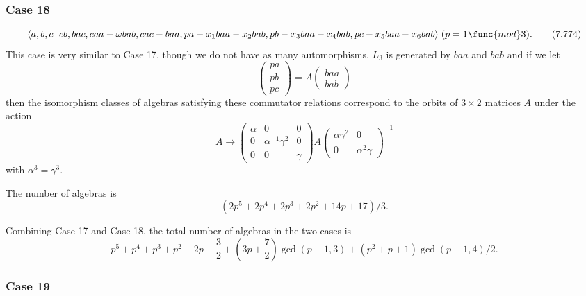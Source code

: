 \documentclass[10pt]{article}
\begin{document}
\subsubsection{Case 18}

\begin{equation}
\langle a,b,c\,|\,cb,bac,caa-\omega
bab,cac-baa,pa-x_{1}baa-x_{2}bab,pb-x_{3}baa-x_{4}bab,pc-x_{5}baa-x_{6}bab%
\rangle \;(p=1\func{mod}3).  \tag{7.774}
\end{equation}%
This case is very similar to Case 17, though we do not have as many
automorphisms. $L_{3}$ is generated by $baa$ and $bab$ and if we let 
\[
\left( 
\begin{array}{l}
pa \\ 
pb \\ 
pc%
\end{array}%
\right) =A\left( 
\begin{array}{l}
baa \\ 
bab%
\end{array}%
\right) 
\]%
then the isomorphism classes of algebras satisfying these commutator
relations correspond to the orbits of $3\times 2$ matrices $A$ under the
action 
\[
A\rightarrow \left( 
\begin{array}{lll}
\alpha & 0 & 0 \\ 
0 & \alpha ^{-1}\gamma ^{2} & 0 \\ 
0 & 0 & \gamma%
\end{array}%
\right) A\left( 
\begin{array}{ll}
\alpha \gamma ^{2} & 0 \\ 
0 & \alpha ^{2}\gamma%
\end{array}%
\right) ^{-1} 
\]%
with $\alpha ^{3}=\gamma ^{3}$.

The number of algebras is 
\[
(2p^{5}+2p^{4}+2p^{3}+2p^{2}+14p+17)/3. 
\]

Combining Case 17 and Case 18, the total number of algebras in the two cases
is 
\[
\allowbreak p^{5}+p^{4}+p^{3}+p^{2}-2p-\frac{3}{2}+(3p+\frac{7}{2})\gcd
(p-1,3)+(p^{2}+p+1)\gcd (p-1,4)/2. 
\]

\subsubsection{Case 19}
\end{document}
